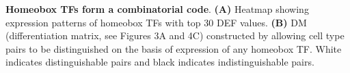 \textbf{Homeobox TFs form a combinatorial code}.  
\textbf{(A)} Heatmap showing expression patterns of homeobox TFs with top 30 DEF values. \textbf{(B)} DM (differentiation matrix, see Figures 3A and 4C) constructed by allowing cell type pairs to be distinguished on the basis of expression of any homeobox TF. White indicates distinguishable pairs and black indicates indistinguishable pairs. 